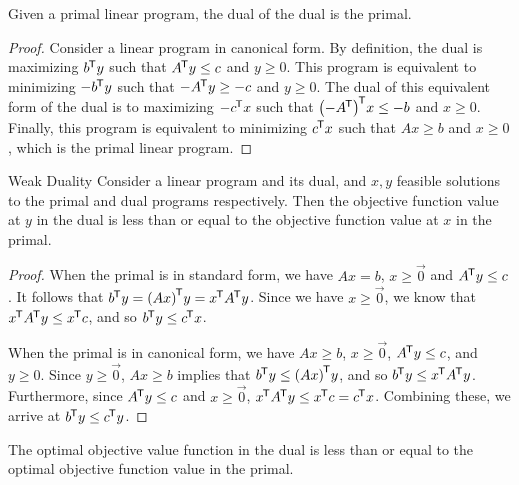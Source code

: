 \newpage

\begin{prop}
    Given a primal linear program, the dual of the dual is the primal.
\end{prop}

\begin{proof}
    Consider a linear program in canonical form.  By definition, the dual is maximizing ${b}^{\mkern-1.5mu\mathsf{T}}y$ such that ${A}^{\mkern-1.5mu\mathsf{T}}y \leq c$ and $y \geq 0$. This program is equivalent to minimizing $-{b}^{\mkern-1.5mu\mathsf{T}}y$ such that $-{A}^{\mkern-1.5mu\mathsf{T}}y \geq -c$ and $y \geq 0$. The dual of this equivalent form of the dual is to maximizing $-{c}^{\mkern-1.5mu\mathsf{T}}x$ such that ${\left(-{A}^{\mkern-1.5mu\mathsf{T}}\right)}^{\mkern-1.5mu\mathsf{T}}x \leq -b$ and $x \geq 0$. Finally, this program is equivalent to minimizing ${c}^{\mkern-1.5mu\mathsf{T}}x$ such that $Ax \geq b$ and $x \geq 0$, which is the primal linear program.
\end{proof}

\begin{thm}{Weak Duality}\label{weak-duality}\proofbreak
    Consider a linear program and its dual, and $x, y$ feasible solutions to the primal and dual programs respectively. Then the objective function value at $y$ in the dual is less than or equal to the objective function value at $x$ in the primal.
\end{thm}

\begin{proof}
    When the primal is in standard form, we have $Ax = b$, $x \geq \vec{0}$ and ${A}^{\mkern-1.5mu\mathsf{T}}y \leq c$. It follows that ${b}^{\mkern-1.5mu\mathsf{T}}y = {(Ax)}^{\mkern-1.5mu\mathsf{T}}y = {x}^{\mkern-1.5mu\mathsf{T}}{A}^{\mkern-1.5mu\mathsf{T}}y$. Since we have $x \geq \vec{0}$, we know that ${x}^{\mkern-1.5mu\mathsf{T}}{A}^{\mkern-1.5mu\mathsf{T}}y \leq {x}^{\mkern-1.5mu\mathsf{T}}c$, and so ${b}^{\mkern-1.5mu\mathsf{T}}y \leq {c}^{\mkern-1.5mu\mathsf{T}}x$.

    When the primal is in canonical form, we have $Ax \geq b$, $x \geq \vec{0}$, ${A}^{\mkern-1.5mu\mathsf{T}}y \leq c$, and $y \geq 0$. Since $y \geq \vec{0}$, $Ax \geq b$ implies that ${b}^{\mkern-1.5mu\mathsf{T}}y \leq {(Ax)}^{\mkern-1.5mu\mathsf{T}}y$, and so ${b}^{\mkern-1.5mu\mathsf{T}}y \leq {x}^{\mkern-1.5mu\mathsf{T}}{A}^{\mkern-1.5mu\mathsf{T}}y$. Furthermore, since ${A}^{\mkern-1.5mu\mathsf{T}}y \leq c$ and $x \geq \vec{0}$, ${x}^{\mkern-1.5mu\mathsf{T}}{A}^{\mkern-1.5mu\mathsf{T}}y \leq {x}^{\mkern-1.5mu\mathsf{T}}c = {c}^{\mkern-1.5mu\mathsf{T}}x$. Combining these, we arrive at ${b}^{\mkern-1.5mu\mathsf{T}}y \leq {c}^{\mkern-1.5mu\mathsf{T}}y$.
\end{proof}

\begin{cor}
    The optimal objective value function in the dual is less than or equal to the optimal objective function value in the primal.
\end{cor}

